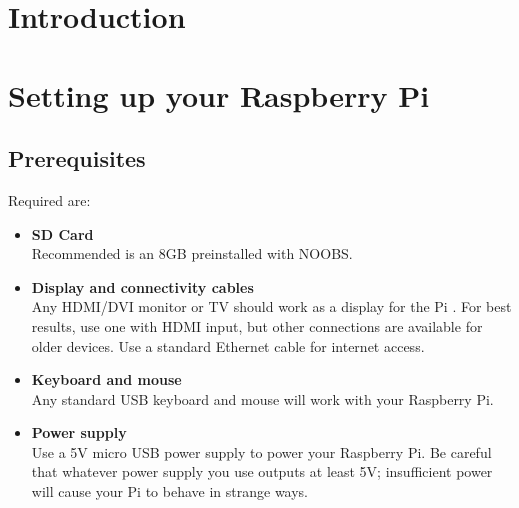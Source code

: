 \documentclass[
10pt, %
a4paper, %
oneside, %
headinclude,footinclude, %
BCOR5mm, %
]{scrartcl}
\begin{document}
\newpage %

\section{Introduction}

\section{Setting up your Raspberry Pi}
\subsection{Prerequisites}
Required are:
\begin{itemize}
	\item \textbf{SD Card}\\
		Recommended is an 8GB preinstalled with NOOBS.
	\item \textbf{Display and connectivity cables} \\
	Any HDMI/DVI monitor or TV should work as a display for the Pi . For best results, use one with HDMI input, but other connections are available for older devices. Use a standard Ethernet cable for internet access.
	\item \textbf{Keyboard and mouse} \\
	Any standard USB keyboard and mouse will work with your Raspberry Pi.
	\item \textbf{Power supply} \\
	Use a 5V micro USB power supply to power your Raspberry Pi. Be careful that whatever power supply you use outputs at least 5V; insufficient power will cause your Pi to behave in strange ways.
\end{itemize}

\end{document}
